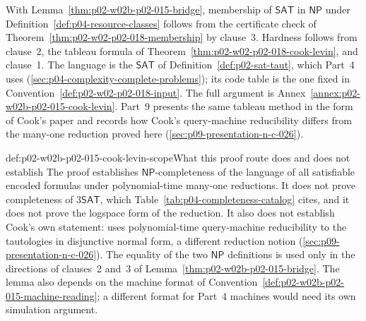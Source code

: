 With Lemma~\ref{thm:p02-w02b-p02-015-bridge}, membership of \(\mathsf{SAT}\)
in \(\mathsf{NP}\) under Definition~\ref{def:p04-resource-classes} follows
from the certificate check of
Theorem~\ref{thm:p02-w02-p02-018-membership} by clause~3.  Hardness follows
from clause~2, the tableau formula of
Theorem~\ref{thm:p02-w02-p02-018-cook-levin}, and clause~1.  The language is
the \(\mathsf{SAT}\) of Definition~\ref{def:p02-sat-taut}, which Part~4 uses
(\cref{sec:p04-complexity-complete-problems}); its code table is the one
fixed in Convention~\ref{def:p02-w02-p02-018-input}.  The full argument is
Annex~\ref{annex:p02-w02b-p02-015-cook-levin}.  Part~9 presents the same
tableau method in the form of Cook's paper and records how Cook's
query-machine reducibility differs from the many-one reduction proved here
(\cref{sec:p09-presentation-n-c-026}).

\begin{hbwarning}{def:p02-w02b-p02-015-cook-levin-scope}{What this proof route does and does not establish}
The proof establishes \(\mathsf{NP}\)-completeness of the language of all
satisfiable encoded formulas under polynomial-time many-one reductions.  It
does not prove completeness of \(3\mathsf{SAT}\), which
Table~\ref{tab:p04-completeness-catalog} cites, and it does not prove the
logspace form of the reduction.  It also does not establish Cook's own
statement: \textcite{Cook1971} uses polynomial-time query-machine
reducibility to the tautologies in disjunctive normal form, a different
reduction notion (\cref{sec:p09-presentation-n-c-026}).  The equality of the
two \(\mathsf{NP}\) definitions is used only in the directions of clauses~2
and~3 of Lemma~\ref{thm:p02-w02b-p02-015-bridge}.  The lemma also depends on
the machine format of
Convention~\ref{def:p02-w02b-p02-015-machine-reading}; a different format for
Part~4 machines would need its own simulation argument.
\end{hbwarning}
